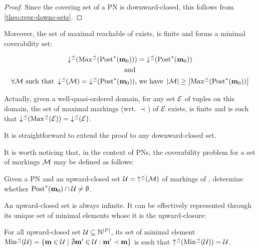 \begin{proof}
  Since the covering set of a PN is downward-closed, this follows from \cref{theo:repr-downc-sets}.
\end{proof}

Moreover, the set of maximal reachable \omarks of \namePN exists, is finite and forms a minimal coverability set:


\begin{gather*}
\operatorname{\downarrow^\preceq}(\operatorname{Max^\preceq}(\operatorname{Post}^*_{{}}(\mathbf{m}_0))) = \operatorname{\downarrow^\preceq}(\operatorname{Post}^*_{{}}(\mathbf{m}_0)) \\*
\text{ and } \\*
\forall \mathcal{M} \text{ such that } \operatorname{\downarrow^\preceq}(\mathcal{M}) = \operatorname{\downarrow^\preceq}(\operatorname{Post}^*_{{}}(\mathbf{m}_0))\text{, we have } \left|\mathcal{M}\right| \geq \left|\operatorname{Max^\preceq}(\operatorname{Post}^*_{{}}(\mathbf{m}_0))\right|
\end{gather*}

Actually, given a well-quasi-ordered domain, for any set $\mathcal{E}$ of tuples on this domain, the set of maximal markings (wrt. $\prec$) of $\mathcal{E}$ exists, is finite and is such that $\operatorname{\downarrow^\preceq}(\operatorname{Max^\preceq}(\mathcal{E})) = \operatorname{\downarrow^\preceq}(\mathcal{E})$.


It is straightforward to extend the proof to any downward-closed set.

It is worth noticing that, in the context of \acp{PN}, the coverability problem for a set of markings $\mathcal{M}$ may be defined as follows:
\begin{defi}
  \label{defi:upclocovprblm}
  Given a \ac{PN} \namePN and an upward-closed set $\mathcal{U} = \operatorname{\uparrow^\preceq}(\mathcal{M})$ of markings of \namePN, determine whether $\operatorname{Post}^*_{{}}(\mathbf{m}_0) \cap \mathcal{U} \neq \emptyset$.
\end{defi}

An upward-closed set is always infinite.
It can be effectively represented through its unique set of minimal elements whose it is the upward-closure:
\begin{lemm}
  For all upward-closed set $\mathcal{U} \subseteq \mathbb{N}^{\left|P\right|}$, its set of minimal element $\operatorname{Min^\preceq}(\mathcal{U}) = \{\mathbf{m} \in \mathcal{U} \mid \nexists \mathbf{m}' \in \mathcal{U} : \mathbf{m}' \prec \mathbf{m}\}$ is such that $\operatorname{\uparrow^\preceq}(\operatorname{Min^\preceq}(\mathcal{U})) = \mathcal{U}$.
\end{lemm}

